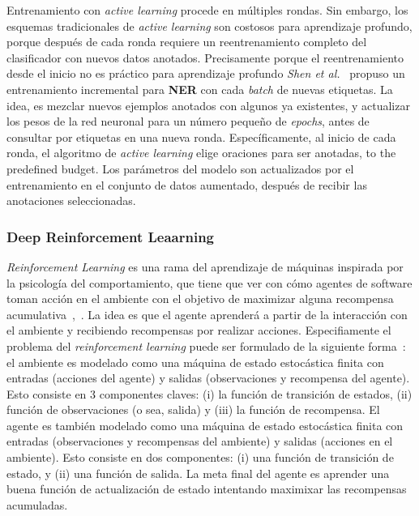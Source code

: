 Entrenamiento con \emph{active learning} procede en m\'ultiples rondas. Sin embargo, los esquemas tradicionales de \emph{active learning} son costosos para aprendizaje profundo, porque despu\'es de cada ronda requiere un reentrenamiento completo del clasificador con nuevos datos anotados. Precisamente porque el reentrenamiento desde el inicio no es pr\'actico para aprendizaje profundo \emph{Shen et al.}~\cite{shen2017deep} propuso un entrenamiento incremental para \textbf{NER} con cada \emph{batch} de nuevas etiquetas. La idea, es mezclar nuevos ejemplos anotados con algunos ya existentes, y actualizar los pesos de la red neuronal para un n\'umero peque\~no de \emph{epochs}, antes de consultar por etiquetas en una nueva ronda. Espec\'ificamente, al inicio de cada ronda, el algoritmo de \emph{active learning} elige oraciones para ser anotadas,
to the predefined budget. Los par\'ametros del modelo son actualizados por el entrenamiento en el conjunto de datos aumentado, despu\'es de recibir las anotaciones seleccionadas.

\subsubsection{Deep Reinforcement Leaarning}

\emph{Reinforcement Learning} es una rama del aprendizaje de m\'aquinas inspirada por la psicolog\'ia del comportamiento, que tiene que ver con c\'omo agentes de software toman acci\'on en el ambiente con el objetivo de maximizar alguna recompensa acumulativa~\cite{kaelbling1996reinforcement},~\cite{sutton1998introduction}. La idea es que el agente aprender\'a a partir de la interacci\'on con el ambiente y recibiendo recompensas por realizar acciones. Especifiamente el problema del \emph{reinforcement learning} puede ser formulado de la siguiente forma~\cite{hoi2018online}: el ambiente es modelado como una m\'aquina de estado estoc\'astica finita con entradas (acciones del agente) y salidas (observaciones y recompensa del agente). Esto consiste en 3 componentes claves: (i) la funci\'on de transici\'on de estados, (ii) funci\'on de observaciones (o sea, salida) y (iii) la funci\'on de recompensa. El agente es tambi\'en modelado como una m\'aquina de estado estoc\'astica finita con entradas (observaciones y recompensas del ambiente) y salidas (acciones en el ambiente). Esto consiste en dos componentes: (i) una funci\'on de transici\'on de estado, y (ii) una funci\'on de salida. La meta final del agente es aprender una buena funci\'on de actualizaci\'on de estado intentando maximixar las recompensas acumuladas.

